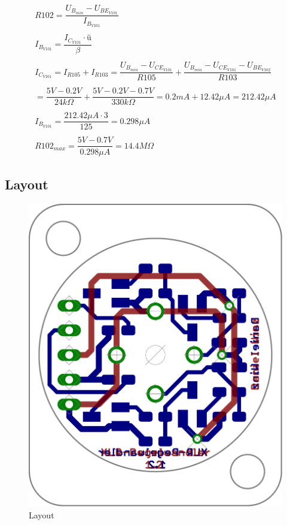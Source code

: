 %
\[ \begin{array}{l}
R102 
= \dfrac{U_{B_{min}} - U_{BE_{V101}}}{I_{B_{V101}}}\\\\
I_{B_{V101}} 
= \dfrac{I_{C_{V101}} \cdot ü}{\beta}\\\\
I_{C_{V101}} 
= I_{R105} + I_{R103} 
= \dfrac{U_{B_{min}} - U_{CE_{V101}}}{R105} + \dfrac{U_{B_{min}} - U_{CE_{V101}} - U_{BE_{V102}}}{R103} \\\\
= \dfrac{5 V - 0.2 V}{24 k \Omega} + \dfrac{5 V - 0.2 V - 0.7 V}{330 k \Omega} 
= 0.2 mA + 12.42 \mu A 
= 212.42 \mu A \\\\
I_{B_{V101}} 
= \dfrac{212.42 \mu A \cdot 3}{125} 
= 0.298 \mu A \\\\
R102_{max} 
= \dfrac{5 V - 0.7 V}{0.298 \mu A} 
= 14.4 M \Omega
\end{array} \]

\subsection{Layout}
\begin{figure}[h!]
	\centering
	\includegraphics[scale=\layscale]{fig/xlr_pegelwandler_v_1_2_lay_transp.pdf}
	\caption{Layout}
	\label{lay:pegw}
\end{figure}
